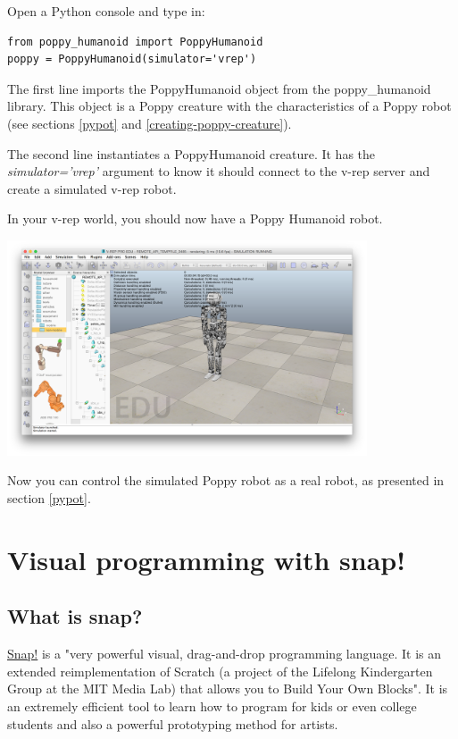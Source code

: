 \documentclass{article}
\begin{document}
Open a Python console and type in:

\begin{verbatim}
from poppy_humanoid import PoppyHumanoid
poppy = PoppyHumanoid(simulator='vrep')
\end{verbatim}

The first line imports the PoppyHumanoid object from the poppy\_humanoid library. This object is a Poppy creature with the characteristics of a Poppy robot (see sections \ref{pypot} and \ref{creating-poppy-creature}).

The second line instantiates a PoppyHumanoid creature. It has the \textit{simulator='vrep'} argument to know it should connect to the v-rep server and create a simulated v-rep robot.

In your v-rep world, you should now have a Poppy Humanoid robot.

 \begin{center}
  \includegraphics[width=0.8\textwidth]{img/vrep-poppy}
 \end{center}
   
Now you can control the simulated Poppy robot as a real robot, as presented in section \ref{pypot}.



\section{Visual programming with snap!}
\label{programming-with-snap}

\subsection{What is snap?}

\href{http://snap.berkeley.edu/}{Snap!} is a "very powerful visual, drag-and-drop programming language. It is an extended reimplementation of Scratch (a project of the Lifelong Kindergarten Group at the MIT Media Lab) that allows you to Build Your Own Blocks". It is an extremely efficient tool to learn how to program for kids or even college students and also a powerful prototyping method for artists.
\end{document}
